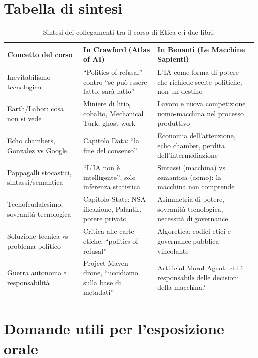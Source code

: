 \documentclass[a4paper,11pt]{article}
\begin{document}
\section{Tabella di sintesi}

\begin{table}[h!]
\centering
\renewcommand{\arraystretch}{1.3}
\begin{tabular}{p{4.2cm}p{5.3cm}p{5.3cm}}
\toprule
\textbf{Concetto del corso} & \textbf{In Crawford (Atlas of AI)} & \textbf{In Benanti (Le Macchine Sapienti)} \\
\midrule
Inevitabilismo tecnologico & ``Politics of refusal'' contro ``se può essere fatto, sarà fatto'' & L'IA come forma di potere che richiede scelte politiche, non un destino \\
Earth/Labor: cosa non si vede & Miniere di litio, cobalto, Mechanical Turk, ghost work & Lavoro e nuova competizione uomo-macchina nel processo produttivo \\
Echo chambers, Gonzalez vs Google & Capitolo Data: ``la fine del consenso'' & Economia dell'attenzione, echo chamber, perdita dell'intermediazione \\
Pappagalli stocastici, sintassi/semantica & ``L'IA non è intelligente'', solo inferenza statistica & Sintassi (macchina) vs semantica (uomo): la macchina non comprende \\
Tecnofeudalesimo, sovranità tecnologica & Capitolo State: NSA-ificazione, Palantir, potere privato & Asimmetria di potere, sovranità tecnologica, necessità di governance \\
Soluzione tecnica vs problema politico & Critica alle carte etiche, ``politics of refusal'' & Algoretica: codici etici e governance pubblica vincolante \\
Guerra autonoma e responsabilità & Project Maven, drone, ``uccidiamo sulla base di metadati'' & Artificial Moral Agent: chi è responsabile delle decisioni della macchina? \\
\bottomrule
\end{tabular}
\caption{Sintesi dei collegamenti tra il corso di Etica e i due libri.}
\end{table}

\section{Domande utili per l'esposizione orale}
\end{document}
